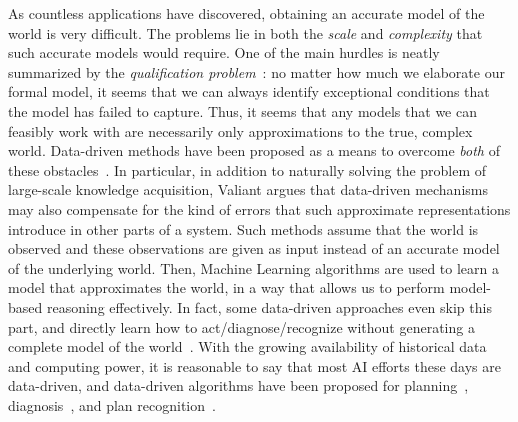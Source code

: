 \documentclass[12pt]{article}
\newcommand{\note}[1]{\textbf{\textit{#1}}}
\begin{document}


As countless applications have discovered, obtaining an accurate model of the world is very difficult. The problems lie in both the {\em scale} and {\em complexity} that such accurate models would require. One of the main hurdles is neatly summarized by the {\em qualification problem}~\cite{mccarthy1987epistemological}: no matter how much we elaborate our formal model, it seems that we can always identify exceptional conditions that the model has failed to capture. Thus, it seems that any models that we can feasibly work with are necessarily only approximations to the true, complex world. Data-driven methods have been proposed as a means to overcome {\em both} of these obstacles~\cite{valiant2000neuroidal,valiant2000robustLogics}. In particular, in addition to naturally solving the problem of large-scale knowledge acquisition, Valiant argues that data-driven mechanisms may also compensate for the kind of errors that such approximate representations introduce in other parts of a system. Such methods assume that the world is observed and these observations are given as input instead of an accurate model of the underlying world. Then, Machine Learning algorithms are used to learn a model that approximates the world, 
in a way that allows us to perform model-based reasoning effectively. 
In fact, some data-driven approaches even skip this part, and directly learn how to act/diagnose/recognize without generating a complete model of the world~\cite{kearns2002POMDPsample}.
With the growing availability of historical data and computing power, it is reasonable to say that most AI efforts these days are data-driven,
and data-driven algorithms have been proposed for planning~\cite{fern2011first}, diagnosis~\cite{keren2011model,qin2012survey}, and plan recognition~\cite{peng2011helix,tian2016discovering,harpstead2013investigating}. 
\end{document}
